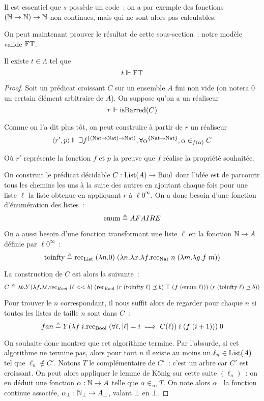 \documentclass{article}
\begin{document}
\begin{rmk}
    Il est essentiel que $s$ possède un code~: on a par exemple des fonctions $(\mathbb{N}\to\mathbb{N}) \to \mathbb{N}$ non continues, mais qui ne sont alors pas calculables.
\end{rmk}

On peut maintenant prouver le résultat de cette sous-section~: notre modèle valide $\mathrm{FT}$.

\begin{them}
    Il existe $t \in \Lambda$ tel que
    \[t \Vdash \mathrm{FT}\]
\end{them}

\begin{proof}
    Soit un prédicat croissant $C$ sur un ensemble $A$ fini non vide (on notera $0$ un certain élément arbitraire de $A$). On suppose qu'on a un réaliseur
    \[r \Vdash \mathrm{isBarred}(C)\]

    Comme on l'a dit plus tôt, on peut construire à partir de $r$ un réaliseur
    \[\langle r',p\rangle \Vdash \exists f^{\{(\mathrm{Nat}\to\mathrm{Nat})\to\mathrm{Nat})}, \forall \alpha^{\{\mathrm{Nat}\to\mathrm{Nat}\}}, \alpha\in_{f(\alpha)} C\]

    Où $r'$ représente la fonction $f$ et $p$ la preuve que $f$ réalise la propriété souhaitée.
    
    On construit le prédicat décidable $C : \mathrm{List}(A) \to \mathrm{Bool}$ dont l'idée est de parcourir tous les chemins les uns à la suite des autres en ajoutant chaque fois pour une liste $\ell$ la liste obtenue en appliquant $r$ à $\ell 0^\infty$. On a donc besoin d'une fonction d'énumération des listes~:
    \[\mathrm{enum} \triangleq A FAIRE\]

    On a aussi besoin d'une fonction transformant une liste $\ell$ en la fonction $\mathbb{N} \to A$ définie par $\ell 0^\infty$~:
    \[\mathrm{toinfty} \triangleq \mathrm{rec}_{\mathrm{List}}\;(\lambda n.0)\;(\lambda n.\lambda x.\lambda f.\mathrm{rec}_{\mathrm{Nat}}\;n\;(\lambda m.\lambda g.f\;m))\]

    La construction de $C$ est alors la suivante~:
    \[C \triangleq \lambda b. Y(\lambda f. \lambda \ell. \mathrm{rec}_{Bool}\;(\ell << b)\;(\mathrm{rec}_{\mathrm{Bool}}\;(r\;(\mathrm{toinfty}\;\ell)\preceq b)\;\top\;(f\;(\mathrm{enum}\;\ell)))\;(r\;(\mathrm{toinfty}\;\ell) \preceq b))\]

    Pour trouver le $n$ correspondant, il nous suffit alors de regarder pour chaque $n$ si toutes les listes de taille $n$ sont dans $C$~:
    \[fan\triangleq Y (\lambda f\;i. \mathrm{rec}_{\mathrm{Bool}}\;(\forall \ell, |\ell| = i \implies C(\ell))\;i\;(f\;(i+1)))\;0\]

    On souhaite donc montrer que cet algorithme termine. Par l'absurde, si cet algorithme ne termine pas, alors pour tout $n$ il existe au moins un $\ell_n \in \mathrm{List}(A)$ tel que $\ell_n \notin C'$. Notons $T$ le complémentaire de $C'$~: c'est un arbre car $C'$ est croissant. On peut alors appliquer le lemme de König sur cette suite $(\ell_n)$~: on en déduit une fonction $\alpha : \mathbb{N} \to A$ telle que $\alpha \in_\infty T$. On note alors $\alpha_\bot$ la fonction continue associée, $\alpha_\bot : \mathbb{N}_\bot \to A_\bot$, valant $\bot$ en $\bot$.


\end{proof}
\end{document}
